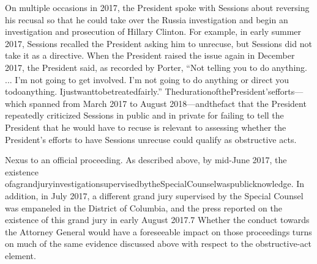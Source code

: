 On multiple occasions in 2017, the President spoke with Sessions about reversing his recusal so that he could take over the Russia investigation and begin an investigation and prosecution of Hillary Clinton.
For example, in early summer 2017, Sessions recalled the President asking him to unrecuse, but Sessions did not take it as a directive.
When the President raised the issue again in December 2017, the President said, as recorded by Porter, “Not telling you to do anything. ...
I'm not going to get involved.
I'm not going to do anything or direct you todoanything.
Ijustwanttobetreatedfairly.”
ThedurationofthePresident'sefforts—which spanned from March 2017 to August 2018—andthefact that the President repeatedly criticized Sessions in public and in private for failing to tell the President that he would have to recuse is relevant to assessing whether the President's efforts to have Sessions unrecuse could qualify as obstructive acts.

Nexus to an official proceeding.
As described above, by mid-June 2017, the existence ofagrandjuryinvestigationsupervisedbytheSpecialCounselwaspublicknowledge.
In addition, in July 2017, a different grand jury supervised by the Special Counsel was empaneled in the District of Columbia, and the press reported on the existence of this grand jury in early August 2017.7
Whether the conduct towards the Attorney General would have a foreseeable impact on those proceedings turns on much of the same evidence discussed above with respect to the obstructive-act element.

